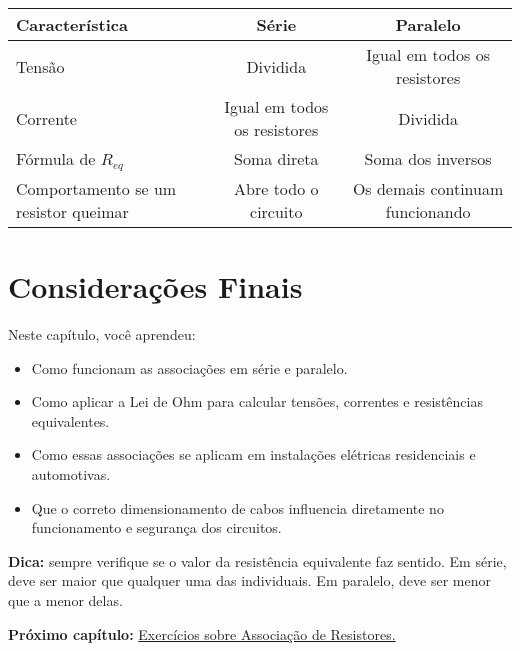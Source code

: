 \begin{center}
\begin{tabular}{|l|c|c|}
\hline
\textbf{Característica} & \textbf{Série} & \textbf{Paralelo} \\
\hline
Tensão & Dividida & Igual em todos os resistores \\
Corrente & Igual em todos os resistores & Dividida \\
Fórmula de $R_{eq}$ & Soma direta & Soma dos inversos \\
Comportamento se um resistor queimar & Abre todo o circuito & Os demais continuam funcionando \\
\hline
\end{tabular}
\end{center}

\section{Considerações Finais}
Neste capítulo, você aprendeu:

\begin{itemize}
    \item Como funcionam as associações em série e paralelo.
    \item Como aplicar a Lei de Ohm para calcular tensões, correntes e resistências equivalentes.
    \item Como essas associações se aplicam em instalações elétricas residenciais e automotivas.
    \item Que o correto dimensionamento de cabos influencia diretamente no funcionamento e segurança dos circuitos.
\end{itemize}

\textbf{Dica:} sempre verifique se o valor da resistência equivalente faz sentido. Em série, deve ser maior que qualquer uma das individuais. Em paralelo, deve ser menor que a menor delas.

\vspace{0.5cm}
\noindent\textbf{Próximo capítulo:} \hyperref[cap4]{Exercícios sobre Associação de Resistores.}